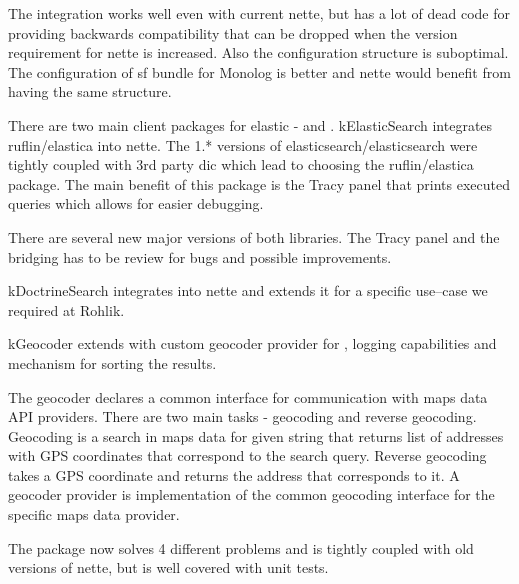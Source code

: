 The integration works well even with current \gls{nette}, but has a lot of dead code for providing backwards compatibility that can be dropped when the version requirement for \gls{nette} is increased. Also the configuration structure is suboptimal. The configuration of \gls{sf} bundle for Monolog is better and \gls{nette} would benefit from having the same structure.

 \label{sec:state:elastic-search}

There are two main client packages for \gls{elastic} -  and . \gls{kElasticSearch} integrates ruflin/elastica into \gls{nette}. The 1.* versions of elasticsearch/elasticsearch were tightly coupled with 3rd party \gls{dic} which lead to choosing the ruflin/elastica package. The main benefit of this package is the Tracy panel that prints executed queries which allows for easier debugging.

There are several new major versions of both libraries. The Tracy panel and the bridging has to be review for bugs and possible improvements.

 \label{sec:state:doctrine-search}

\gls{kDoctrineSearch} integrates  into \gls{nette} and extends it for a specific use--case we required at Rohlik.

 \label{sec:state:geocoder}

\gls{kGeocoder} extends  with custom geo\-co\-de\-r provider for , logging capabilities and mechanism for sorting the results.

The geo\-co\-de\-r declares a common interface for communication with maps data API providers. There are two main tasks - geocoding and reverse geocoding. Geocoding is a search in maps data for given string that returns list of addresses with GPS coordinates that correspond to the search query. Reverse geocoding takes a GPS coordinate and returns the address that corresponds to it. A geo\-co\-de\-r provider is implementation of the common geocoding interface for the specific maps data provider.

The package now solves 4 different problems and is tightly coupled with old versions of \gls{nette}, but is well covered with unit tests.

